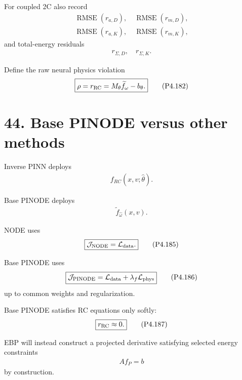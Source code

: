 \documentclass[11pt]{article}
\begin{document}
For coupled 2C also record
\begin{align}
\boxed{
\operatorname{RMSE}(r_{a,D}),
\quad
\operatorname{RMSE}(r_{m,D}),
}
\tag{P4.179}
\end{align}
\begin{align}
\boxed{
\operatorname{RMSE}(r_{a,K}),
\quad
\operatorname{RMSE}(r_{m,K}),
}
\tag{P4.180}
\end{align}
and total-energy residuals
\begin{align}
\boxed{r_{\Sigma,D},\quad r_{\Sigma,K}.}
\tag{P4.181}
\end{align}

Define the raw neural physics violation
\begin{align}
\boxed{
\rho
=
r_{\rm RC}
=
M_\theta\widetilde f_\omega-b_\theta.
}
\tag{P4.182}
\end{align}

\section*{44. Base PINODE versus other methods}

Inverse PINN deploys
\begin{align}
\boxed{
f_{RC}(x,v;\widehat\theta).
}
\tag{P4.183}
\end{align}

Base PINODE deploys
\begin{align}
\boxed{
\widetilde f_{\widehat\omega}(x,v).
}
\tag{P4.184}
\end{align}

NODE uses
\begin{align}
\boxed{
\mathcal J_{\rm NODE}=\mathcal L_{\rm data}.
}
\tag{P4.185}
\end{align}

Base PINODE uses
\begin{align}
\boxed{
\mathcal J_{\rm PINODE}
=
\mathcal L_{\rm data}
+
\lambda_f\mathcal L_{\rm phys}
}
\tag{P4.186}
\end{align}
up to common weights and regularization.

Base PINODE satisfies RC equations only softly:
\begin{align}
\boxed{r_{\rm RC}\approx0.}
\tag{P4.187}
\end{align}

EBP will instead construct a projected derivative satisfying selected energy constraints
\begin{align}
\boxed{Af_P=b}
\tag{P4.188}
\end{align}
by construction.
\end{document}
